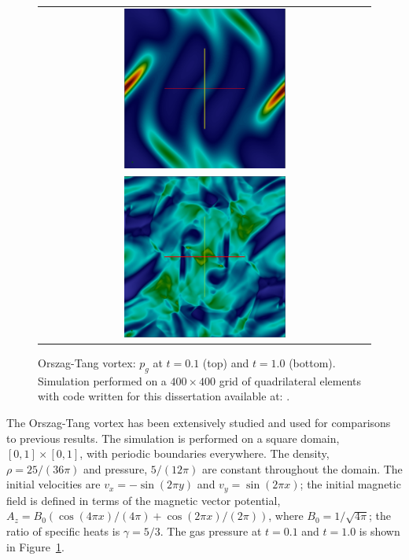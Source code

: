 \begin{figure}[htbp]\figSpace 
\begin{center}
\begin{tabular}{c}
\includegraphics[width=0.5\textwidth]{fig/orszag_tang_0010.png} \\
\includegraphics[width=0.5\textwidth]{fig/orszag_tang_0100.png} 
\end{tabular}
\caption{Orszag-Tang vortex: $p_g$ at $t=0.1$ (top) and $t=1.0$ (bottom).  Simulation performed on a $400 \times 400$ grid of quadrilateral elements with code written for this dissertation available at: \protect\gitrepo.}
\end{center}
\label{fig:orszag_tang}
\figSpace
\end{figure}

The Orszag-Tang vortex \citep{Orszag:1979} has been extensively studied and used for comparisons to previous results.  The simulation is performed on a square domain, $[0,1] \times [0,1]$, with periodic boundaries everywhere.  The density, $\rho = 25/(36\pi)$ and pressure, $5/(12\pi)$ are constant throughout the domain.  The initial velocities are $v_x = -\sin{(2\pi y)}$ and $v_y = \sin{(2\pi x)}$; the initial magnetic field is defined in terms of the magnetic vector potential, $A_z = B_0\left(\cos{(4\pi x)}/(4\pi) + \cos{(2\pi x)}/(2\pi)\right)$, where $B_0 = 1/\sqrt{4\pi}$; the ratio  of specific heats is $\gamma = 5/3$.  The gas pressure at $t=0.1$ and $t=1.0$ is shown in Figure~\ref{fig:orszag_tang}.


